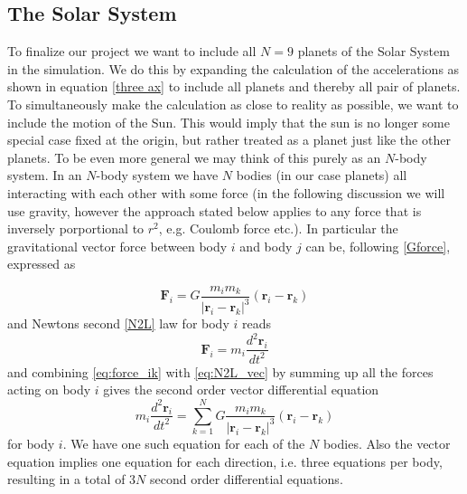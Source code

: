 \documentclass[12pt]{article}
\numberwithin{figure}{section}
\numberwithin{table}{section}
\begin{document}
\subsection{The Solar System}
\noindent To finalize our project we want to include all $N=9$ planets of the Solar System in the simulation. We do this by expanding the calculation of the accelerations as shown in equation \eqref{three ax} to include all planets and thereby all pair of planets.  To simultaneously make the calculation as close to reality as possible, we want to include the motion of the Sun. This would imply that the sun is no longer some special case fixed at the origin, but rather treated as a planet just like the other planets. To be even more general we may think of this purely as an $N$-body system. In an $N$-body system we have $N$ bodies (in our case planets) all interacting with each other with some force (in the following discussion we will use gravity, however the approach stated below applies to any force that is inversely porportional to $r^2$, e.g. Coulomb force etc.). In particular the gravitational vector force between body $i$ and body $j$ can be, following \eqref{Gforce}, expressed as

\begin{equation}
	\mathbf{F}_i=G\frac{m_im_k}{|\mathbf{r}_i-\mathbf{r}_k|^3}(\mathbf{r}_i-\mathbf{r}_k) \label{eq:force_ik}
\end{equation}
and Newtons second \eqref{N2L} law for body $i$ reads
\begin{equation}
	\mathbf{F}_i=m_i\frac{d^2\mathbf{r}_i}{dt^2} \label{eq:N2L_vec}
\end{equation}
and combining \eqref{eq:force_ik} with \eqref{eq:N2L_vec} by summing up all the forces acting on body $i$ gives the second order vector differential equation
\begin{equation}
	m_i\frac{d^2\mathbf{r}_i}{dt^2}=\sum_{k=1}^NG\frac{m_im_k}{|\mathbf{r}_i-\mathbf{r}_k|^3}(\mathbf{r}_i-\mathbf{r}_k) \label{eq:N2L_nbody}
\end{equation}
for body $i$. We have one such equation for each of the $N$ bodies. Also the vector equation implies one equation for each direction, i.e. three equations per body, resulting in a total of $3N$ second order differential equations. \\
\end{document}
